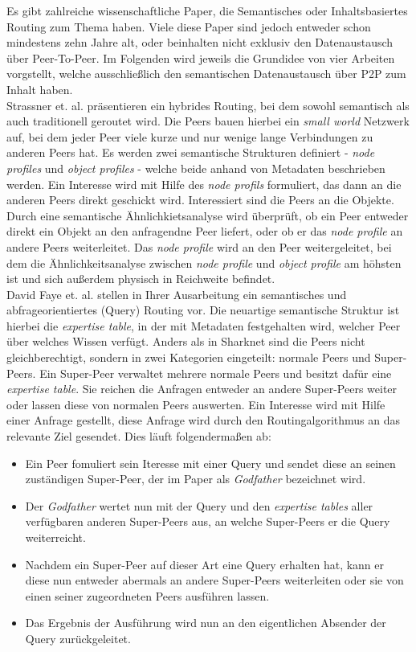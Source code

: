 Es gibt zahlreiche wissenschaftliche Paper, die Semantisches oder Inhaltsbasiertes Routing zum Thema haben. Viele diese Paper sind jedoch entweder schon mindestens zehn Jahre alt, oder beinhalten nicht exklusiv den Datenaustausch über Peer-To-Peer. Im Folgenden wird jeweils die Grundidee von vier Arbeiten vorgstellt, welche ausschließlich den semantischen Datenaustausch über P2P zum Inhalt haben.\\
Strassner et. al. präsentieren ein hybrides Routing, bei dem sowohl semantisch als auch traditionell geroutet wird. Die Peers bauen hierbei ein \textit{small world} Netzwerk auf, bei dem jeder Peer viele kurze und nur wenige lange Verbindungen zu anderen Peers hat. Es werden zwei semantische Strukturen definiert - \textit{node profiles} und \textit{object profiles} - welche beide anhand von Metadaten beschrieben werden. Ein Interesse wird mit Hilfe des \textit{node profils} formuliert, das dann an die anderen Peers direkt geschickt wird. Interessiert sind die Peers an die Objekte. Durch eine semantische Ähnlichkietsanalyse wird überprüft, ob ein Peer entweder direkt ein Objekt an den anfragendne Peer liefert, oder ob er das \textit{node profile} an andere Peers weiterleitet. Das \textit{node profile} wird an den Peer weitergeleitet, bei dem die Ähnlichkeitsanalyse zwischen \textit{node profile} und \textit{object profile} am höhsten ist und sich außerdem physisch in Reichweite befindet. \\
David Faye et. al. stellen in Ihrer Ausarbeitung ein semantisches und abfrageorientiertes (Query) Routing vor. Die neuartige semantische Struktur ist hierbei die \textit{expertise table}, in der mit Metadaten festgehalten wird, welcher Peer über welches Wissen verfügt. Anders als in Sharknet sind die Peers nicht gleichberechtigt, sondern in zwei Kategorien eingeteilt: normale Peers und Super-Peers. Ein Super-Peer verwaltet mehrere normale Peers und besitzt dafür eine \textit{expertise table}. Sie reichen die Anfragen entweder an andere Super-Peers weiter oder lassen diese von normalen Peers auswerten. Ein Interesse wird mit Hilfe einer Anfrage gestellt, diese Anfrage wird durch den Routingalgorithmus an das relevante Ziel gesendet. Dies läuft folgendermaßen ab:
\begin{itemize}
	\item Ein Peer fomuliert sein Iteresse mit einer Query und sendet diese an seinen zuständigen Super-Peer, der im Paper als \textit{Godfather} bezeichnet wird.
	\item Der \textit{Godfather} wertet nun mit der Query und den \textit{expertise tables} aller verfügbaren anderen Super-Peers aus, an welche Super-Peers er die Query weiterreicht.
	\item Nachdem ein Super-Peer auf dieser Art eine Query erhalten hat, kann er diese nun entweder abermals an andere Super-Peers weiterleiten oder sie von einen seiner zugeordneten Peers ausführen lassen.
	\item Das Ergebnis der Ausführung wird nun an den eigentlichen Absender der Query zurückgeleitet.
\end{itemize}
